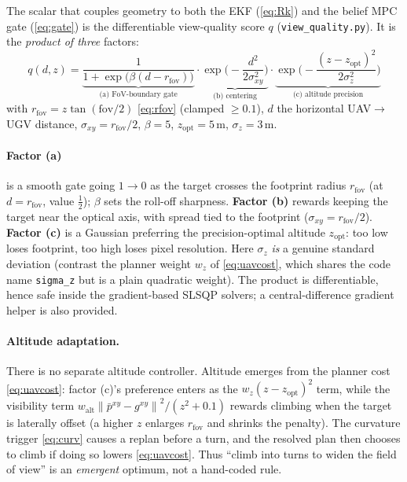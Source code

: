 \documentclass[11pt]{article}
\newcommand{\norm}[1]{\left\lVert #1 \right\rVert}
\newcommand{\bp}{\bar{p}}
\newcommand{\code}[1]{\texttt{#1}}
\newcommand{\fov}{\mathrm{fov}}
\newcommand{\opt}{\mathrm{opt}}
\begin{document}
The scalar that couples geometry to both the EKF (\cref{eq:Rk}) and the belief MPC gate (\cref{eq:gate}) is the
differentiable view-quality score $q$ (\code{view\_quality.py}). It is the \emph{product of three} factors:
\begin{equation}
\boxed{\;
q(d,z) =
\underbrace{\frac{1}{1+\exp\!\big(\beta(d-r_{\fov})\big)}}_{\text{(a) FoV-boundary gate}}
\cdot
\underbrace{\exp\!\Big(-\frac{d^2}{2\sigma_{xy}^2}\Big)}_{\text{(b) centering}}
\cdot
\underbrace{\exp\!\Big(-\frac{(z-z_\opt)^2}{2\sigma_z^2}\Big)}_{\text{(c) altitude precision}}\;}
\label{eq:q}
\end{equation}
with $r_{\fov}=z\tan(\fov/2)$ \cref{eq:rfov} (clamped $\ge0.1$), $d$ the horizontal UAV$\to$UGV distance,
$\sigma_{xy}=r_{\fov}/2$, $\beta=5$, $z_\opt=5$\,m, $\sigma_z=3$\,m.

\paragraph{Factor (a)} is a smooth gate going $1\to0$ as the target crosses the footprint radius $r_{\fov}$
(at $d=r_{\fov}$, value $\tfrac12$); $\beta$ sets the roll-off sharpness. \textbf{Factor (b)} rewards keeping
the target near the optical axis, with spread tied to the footprint ($\sigma_{xy}=r_{\fov}/2$). \textbf{Factor
(c)} is a Gaussian preferring the precision-optimal altitude $z_\opt$: too low loses footprint, too high loses
pixel resolution. Here $\sigma_z$ \emph{is} a genuine standard deviation (contrast the planner weight $w_z$ of
\cref{eq:uavcost}, which shares the code name \code{sigma\_z} but is a plain quadratic weight). The product is
differentiable, hence safe inside the gradient-based SLSQP solvers; a central-difference gradient helper is
also provided.

\paragraph{Altitude adaptation.} There is no separate altitude controller. Altitude emerges from the planner
cost \cref{eq:uavcost}: factor (c)'s preference enters as the $w_z(z-z_\opt)^2$ term, while the visibility
term $w_{\text{alt}}\norm{\bp^{xy}-g^{xy}}^2/(z^2+0.1)$ rewards climbing when the target is laterally
offset (a higher $z$ enlarges $r_{\fov}$ and shrinks the penalty). The curvature trigger \cref{eq:curv} causes
a replan before a turn, and the resolved plan then chooses to climb if doing so lowers \cref{eq:uavcost}.
Thus ``climb into turns to widen the field of view'' is an \emph{emergent} optimum, not a hand-coded rule.
\end{document}
